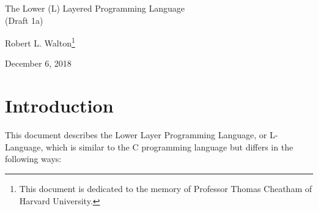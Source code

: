 \documentclass[12pt]{article}
\makeatletter
\renewcommand\tableofcontents{%
    \begin{list}{}%
	     {\setlength{\itemsep}{0in}%
	      \setlength{\topsep}{0in}%
	      \setlength{\parsep}{1ex}%
	      \setlength{\labelwidth}{0in}%
	      \setlength{\baselineskip}{1.5ex}%
	      \setlength{\leftmargin}{1.0in}%
	      \setlength{\rightmargin}{1.0in}}%
    \item\@starttoc{toc}%
    \end{list}}
\makeatother
\begin{document}
        
\begin{center}

{\Large
The Lower (L) Layered Programming Language \\[0.5ex]
(Draft 1a)}

\medskip

Robert L. Walton\footnote{This document is dedicated to the memory
of Professor Thomas Cheatham of Harvard University.}

December 6, 2018
 
\end{center}

{\small \tableofcontents}

\newpage

\section{Introduction}

This document describes the Lower Layer Programming Language, or
L-Language, which is similar to the C programming language
but differs in the following ways:
\end{document}
